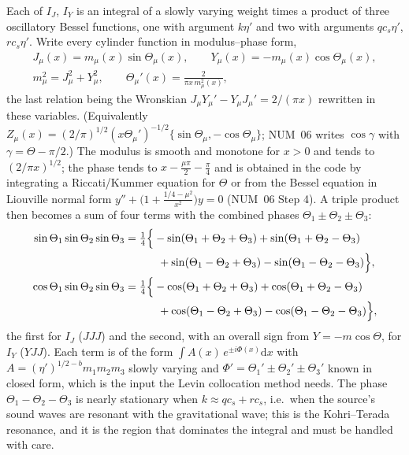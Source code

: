 \documentclass[11pt,a4paper]{article}
\newcommand{\dd}{\mathrm{d}}
\newcommand{\note}[1]{\textsf{#1}}
\theoremstyle{remark}
\begin{document}
Each of $I_J$, $I_Y$ is an integral of a slowly varying weight times a product of three oscillatory Bessel functions, one with argument $k\eta'$ and two with arguments $qc_s\eta'$, $rc_s\eta'$. Write every cylinder function in modulus--phase form,
\begin{equation}
\begin{gathered}
J_\mu(x) = m_\mu(x)\sin\Theta_\mu(x),\qquad Y_\mu(x) = -m_\mu(x)\cos\Theta_\mu(x),\\
m_\mu^2 = J_\mu^2 + Y_\mu^2,\qquad \Theta_\mu'(x) = \frac{2}{\pi x\,m_\mu^2(x)},
\end{gathered}
\label{eq:modulus-phase}
\end{equation}
the last relation being the Wronskian $J_\mu Y_\mu' - Y_\mu J_\mu' = 2/(\pi x)$ rewritten in these variables. (Equivalently $Z_\mu(x) = (2/\pi)^{1/2}(x\Theta_\mu')^{-1/2}\{\sin\Theta_\mu, -\cos\Theta_\mu\}$; \note{NUM}~06 writes $\cos\gamma$ with $\gamma = \Theta-\pi/2$.) The modulus is smooth and monotone for $x>0$ and tends to $(2/\pi x)^{1/2}$; the phase tends to $x - \tfrac{\mu\pi}{2} - \tfrac{\pi}{4}$ and is obtained in the code by integrating a Riccati/Kummer equation for $\Theta$ or from the Bessel equation in Liouville normal form $y'' + \big(1 + \tfrac{1/4-\mu^2}{x^2}\big)y = 0$ (\note{NUM}~06 Step 4). A triple product then becomes a sum of four terms with the combined phases $\Theta_1\pm\Theta_2\pm\Theta_3$:
\begin{align}
\sin\Theta_1\sin\Theta_2\sin\Theta_3 &= \tfrac14\Big\{-\sin(\Theta_1+\Theta_2+\Theta_3) + \sin(\Theta_1+\Theta_2-\Theta_3)\notag\\
&\qquad\quad + \sin(\Theta_1-\Theta_2+\Theta_3) - \sin(\Theta_1-\Theta_2-\Theta_3)\Big\},\\
\cos\Theta_1\sin\Theta_2\sin\Theta_3 &= \tfrac14\Big\{-\cos(\Theta_1+\Theta_2+\Theta_3) + \cos(\Theta_1+\Theta_2-\Theta_3)\notag\\
&\qquad\quad + \cos(\Theta_1-\Theta_2+\Theta_3) - \cos(\Theta_1-\Theta_2-\Theta_3)\Big\},
\end{align}
the first for $I_J$ ($JJJ$) and the second, with an overall sign from $Y = -m\cos\Theta$, for $I_Y$ ($YJJ$). Each term is of the form $\int A(x)\,e^{\pm i\Phi(x)}\dd x$ with $A = (\eta')^{1/2-b}m_1m_2m_3$ slowly varying and $\Phi' = \Theta_1'\pm\Theta_2'\pm\Theta_3'$ known in closed form, which is the input the Levin collocation method needs. The phase $\Theta_1-\Theta_2-\Theta_3$ is nearly stationary when $k\approx qc_s+rc_s$, i.e.\ when the source's sound waves are resonant with the gravitational wave; this is the Kohri--Terada resonance, and it is the region that dominates the integral and must be handled with care.
\end{document}

